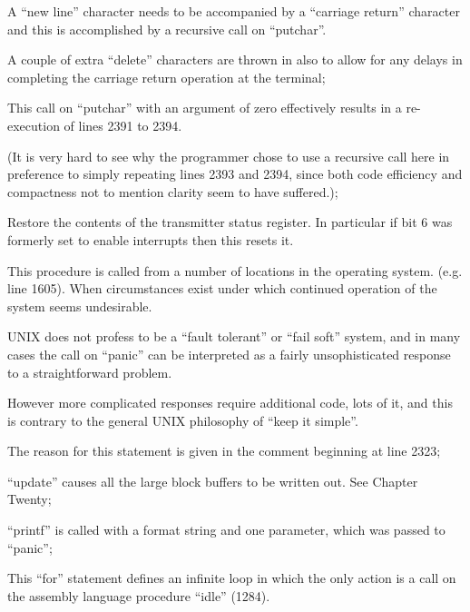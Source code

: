 \item[2400:] A ``new line'' character needs to
 be accompanied by a ``carriage
 return'' character and this is
 accomplished by a recursive call
 on ``putchar''.

A couple of extra ``delete'' characters are thrown in also to
allow for any delays in completing the carriage return operation
at the terminal;

\item[2405:] This call on ``putchar'' with an
 argument of zero effectively
 results in a re-execution of
 lines 2391 to 2394.

(It is very hard to see why the
programmer chose to use a recursive call here in preference to
simply repeating lines 2393 and
2394, since both code efficiency
and compactness not to mention
clarity seem to have suffered.);

\item[2406:] Restore the contents of the
 transmitter status register. In
 particular if bit 6 was formerly
 set to enable interrupts then
 this resets it.
\ed



This procedure is called from a number
of locations in the operating system.
(e.g. line 1605). When circumstances
exist under which continued operation
of the system seems undesirable.


UNIX does not profess to be a ``fault
tolerant'' or ``fail soft'' system, and in
many cases the call on ``panic'' can be
interpreted as a fairly unsophisticated
response to a straightforward problem.

However more complicated responses
require additional code, lots of it,
and this is contrary to the general
UNIX philosophy of ``keep it simple''.

\bd
\item[2419:] The reason for this statement is
 given in the comment beginning at
 line 2323;

\item[2420:] ``update'' causes all the large
 block buffers to be written out.
 See Chapter Twenty;

\item[2421:] ``printf'' is called with a format
 string and one parameter, which
 was passed to ``panic'';

\item[2422:] This ``for'' statement defines an
 infinite loop in which the only
 action is a call on the assembly
 language procedure ``idle'' (1284).

